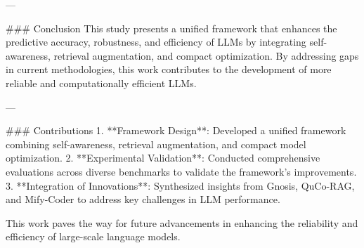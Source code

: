 ---

### Conclusion  
This study presents a unified framework that enhances the predictive accuracy, robustness, and efficiency of LLMs by integrating self-awareness, retrieval augmentation, and compact optimization. By addressing gaps in current methodologies, this work contributes to the development of more reliable and computationally efficient LLMs.

---

### Contributions  
1. **Framework Design**: Developed a unified framework combining self-awareness, retrieval augmentation, and compact model optimization.  
2. **Experimental Validation**: Conducted comprehensive evaluations across diverse benchmarks to validate the framework's improvements.  
3. **Integration of Innovations**: Synthesized insights from Gnosis, QuCo-RAG, and Mify-Coder to address key challenges in LLM performance.

This work paves the way for future advancements in enhancing the reliability and efficiency of large-scale language models.